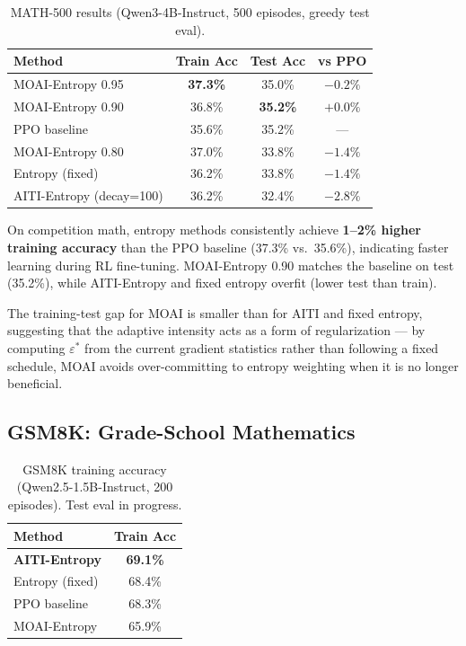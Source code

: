 \documentclass[11pt,a4paper]{article}
\begin{document}
\begin{table}[h]
\centering
\caption{MATH-500 results (Qwen3-4B-Instruct, 500 episodes, greedy test eval).}
\label{tab:math}
\begin{tabular}{lccc}
\toprule
\textbf{Method} & \textbf{Train Acc} & \textbf{Test Acc} & \textbf{vs PPO} \\
\midrule
MOAI-Entropy 0.95 & \textbf{37.3\%} & 35.0\% & $-0.2\%$ \\
MOAI-Entropy 0.90 & 36.8\% & \textbf{35.2\%} & $+0.0\%$ \\
PPO baseline & 35.6\% & 35.2\% & --- \\
MOAI-Entropy 0.80 & 37.0\% & 33.8\% & $-1.4\%$ \\
Entropy (fixed) & 36.2\% & 33.8\% & $-1.4\%$ \\
AITI-Entropy (decay=100) & 36.2\% & 32.4\% & $-2.8\%$ \\
\bottomrule
\end{tabular}
\end{table}

On competition math, entropy methods consistently achieve \textbf{1--2\% higher training accuracy} than the PPO baseline (37.3\% vs.\ 35.6\%), indicating faster learning during RL fine-tuning. MOAI-Entropy 0.90 matches the baseline on test (35.2\%), while AITI-Entropy and fixed entropy overfit (lower test than train).

The training-test gap for MOAI is smaller than for AITI and fixed entropy, suggesting that the adaptive intensity acts as a form of regularization --- by computing $\varepsilon^*$ from the current gradient statistics rather than following a fixed schedule, MOAI avoids over-committing to entropy weighting when it is no longer beneficial.

\subsection{GSM8K: Grade-School Mathematics}

\begin{table}[h]
\centering
\caption{GSM8K training accuracy (Qwen2.5-1.5B-Instruct, 200 episodes). Test eval in progress.}
\label{tab:gsm8k}
\begin{tabular}{lc}
\toprule
\textbf{Method} & \textbf{Train Acc} \\
\midrule
\textbf{AITI-Entropy} & \textbf{69.1\%} \\
Entropy (fixed) & 68.4\% \\
PPO baseline & 68.3\% \\
MOAI-Entropy & 65.9\% \\
\bottomrule
\end{tabular}
\end{table}
\end{document}
